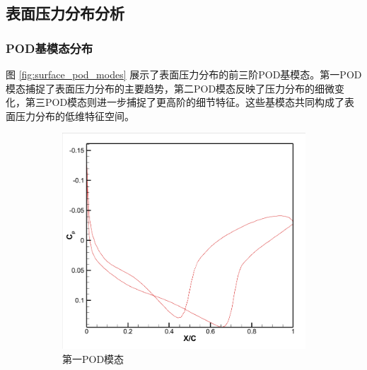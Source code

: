 \subsection{表面压力分布分析}

\subsubsection{POD基模态分布}

图 \ref{fig:surface_pod_modes} 展示了表面压力分布的前三阶POD基模态。第一POD模态捕捉了表面压力分布的主要趋势，第二POD模态反映了压力分布的细微变化，第三POD模态则进一步捕捉了更高阶的细节特征。这些基模态共同构成了表面压力分布的低维特征空间。

\begin{figure}[H]
    \centering
    \begin{subfigure}[b]{0.32\textwidth}
        \includegraphics[width=\textwidth]{image/基压力分布图/单变量表面压力基1.png}
        \caption{第一POD模态}
    \end{subfigure}
    \begin{subfigure}[b]{0.32\textwidth}

\end{subfigure}
\end{figure}
